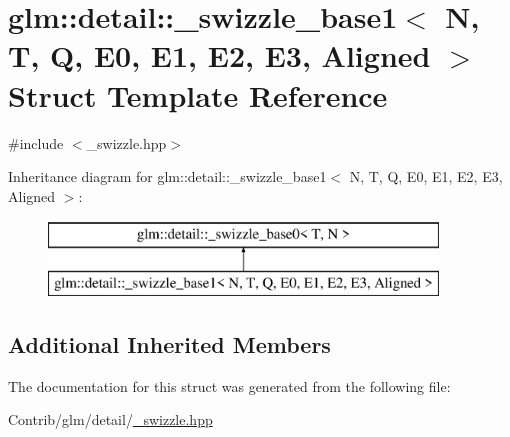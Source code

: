 \hypertarget{structglm_1_1detail_1_1__swizzle__base1}{}\section{glm\+:\+:detail\+:\+:\+\_\+swizzle\+\_\+base1$<$ N, T, Q, E0, E1, E2, E3, Aligned $>$ Struct Template Reference}
\label{structglm_1_1detail_1_1__swizzle__base1}


{\ttfamily \#include $<$\+\_\+swizzle.\+hpp$>$}

Inheritance diagram for glm\+:\+:detail\+:\+:\+\_\+swizzle\+\_\+base1$<$ N, T, Q, E0, E1, E2, E3, Aligned $>$\+:\begin{figure}[H]
\begin{center}
\leavevmode
\includegraphics[height=2.000000cm]{structglm_1_1detail_1_1__swizzle__base1}
\end{center}
\end{figure}
\subsection*{Additional Inherited Members}


The documentation for this struct was generated from the following file\+:\begin{DoxyCompactItemize}
\item 
Contrib/glm/detail/\mbox{\hyperlink{__swizzle_8hpp}{\+\_\+swizzle.\+hpp}}\end{DoxyCompactItemize}
